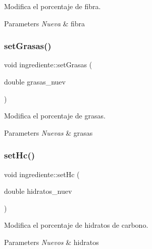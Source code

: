 Modifica el porcentaje de fibra. 


\begin{DoxyParams}{Parameters}
{\em Nueva} & fibra \\
\hline
\end{DoxyParams}
\mbox{\label{classingrediente_aa37c96f2c86407808372b6f3d51dc4b6}} 
\subsubsection{\texorpdfstring{set\+Grasas()}{setGrasas()}}
{\footnotesize\ttfamily void ingrediente\+::set\+Grasas (\begin{DoxyParamCaption}\item[{double}]{grasas\+\_\+nuev }\end{DoxyParamCaption})}



Modifica el porcentaje de grasas. 


\begin{DoxyParams}{Parameters}
{\em Nuevas} & grasas \\
\hline
\end{DoxyParams}
\mbox{\label{classingrediente_a15f92ad0ecb6ca0ddead6d31d63b85dc}} 
\subsubsection{\texorpdfstring{set\+Hc()}{setHc()}}
{\footnotesize\ttfamily void ingrediente\+::set\+Hc (\begin{DoxyParamCaption}\item[{double}]{hidratos\+\_\+nuev }\end{DoxyParamCaption})}



Modifica el porcentaje de hidratos de carbono. 


\begin{DoxyParams}{Parameters}
{\em Nuevos} & hidratos \\
\hline
\end{DoxyParams}
\mbox{\label{classingrediente_a61e5140f7d9230ad82025590e8d7a0c1}} 
